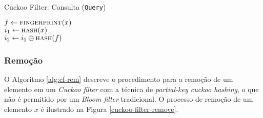 \documentclass[12pt,twoside,english,brazilian]{article}
\begin{document}
\begin{algorithm}
    \caption{Cuckoo Filter: Consulta (\texttt{Query})}\label{alg:cf-cons}

    $f \leftarrow \Call{fingerprint}{x}$ \\
    $i_1 \leftarrow \Call{hash}{x}$ \\
    $i_2 \leftarrow i_1 \oplus \Call{hash}{f}$ \\
\end{algorithm}

\subsubsection{Remoção}

O Algoritmo \ref{alg:cf-rem} descreve o procedimento para a remoção de um elemento em um \textit{Cuckoo filter} com a técnica de \textit{partial-key cuckoo hashing}, o que não é permitido por um \textit{Bloom filter} tradicional. O processo de remoção de um elemento $x$ é ilustrado na Figura \ref{cuckoo-filter-remove}.
\end{document}
